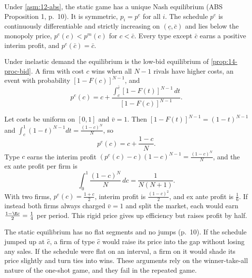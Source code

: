 \begin{proposition}\label{prop:12-abs-static}
Under \cref{asm:12-abs}, the static game has a unique Nash equilibrium (ABS Proposition 1, p.~10). It is symmetric,
$p_i = p^e$ for all $i$. The schedule $p^e$ is continuously differentiable and strictly increasing on
$(\underline c, \bar c)$ and lies below the monopoly price, $p^e(c) < p^m(c)$ for $c < \bar c$. Every type except
$\bar c$ earns a positive interim profit, and $p^e(\bar c) = \bar c$.
\end{proposition}

Under inelastic demand the equilibrium is the low-bid equilibrium of \cref{prop:14-proc-bid}. A firm with cost $c$
wins when all $N - 1$ rivals have higher costs, an event with probability $[1 - F(c)]^{N-1}$, and
\begin{equation}\label{eq:12-abs-pe}
p^e(c) = c + \frac{\int_c^{\bar c}[1 - F(t)]^{N-1}\,dt}{[1 - F(c)]^{N-1}} .
\end{equation}

\begin{example}\label{ex:12-abs-static-uniform}
Let costs be uniform on $[0, 1]$ and $\bar v = 1$. Then $[1 - F(t)]^{N-1} = (1 - t)^{N-1}$ and
$\int_c^1(1 - t)^{N-1}dt = \frac{(1 - c)^N}{N}$, so
\begin{equation*}
p^e(c) = c + \frac{1 - c}{N} .
\end{equation*}
Type $c$ earns the interim profit $(p^e(c) - c)(1 - c)^{N-1} = \frac{(1 - c)^N}{N}$, and the ex ante profit per firm
is
\begin{equation*}
\int_0^1\frac{(1 - c)^N}{N}\,dc = \frac{1}{N(N + 1)} .
\end{equation*}
With two firms, $p^e(c) = \frac{1 + c}{2}$, interim profit is $\frac{(1 - c)^2}{2}$, and ex ante profit is
$\frac{1}{6}$. If instead both firms always charged $\bar v = 1$ and split the market, each would earn
$\frac{1 - \E c}{2} = \frac{1}{4}$ per period. This rigid price gives up efficiency but raises profit by half.
\end{example}

The static equilibrium has no flat segments and no jumps (p.~10). If the schedule jumped up at $\hat c$, a firm of
type $\hat c$ would raise its price into the gap without losing any sales. If the schedule were flat on an interval,
a firm on it would shade its price slightly and turn ties into wins. These arguments rely on the winner-take-all
nature of the one-shot game, and they fail in the repeated game.

